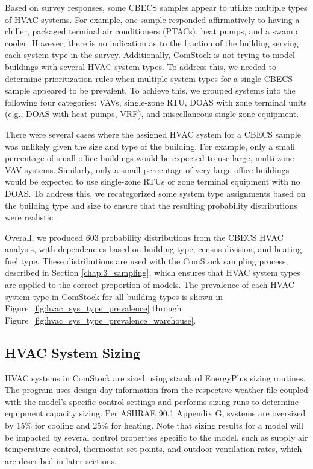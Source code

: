 Based on survey responses, some CBECS samples appear to utilize multiple types of HVAC systems. For example, one sample responded affirmatively to having a chiller, packaged terminal air conditioners (PTACs), heat pumps, and a swamp cooler. However, there is no indication as to the fraction of the building serving each system type in the survey. Additionally, ComStock is not trying to model buildings with several HVAC system types. To address this, we needed to determine prioritization rules when multiple system types for a single CBECS sample appeared to be prevalent. To achieve this, we grouped systems into the following four categories: VAVs, single-zone RTU, DOAS with zone terminal units (e.g., DOAS with heat pumps, VRF), and miscellaneous single-zone equipment.

There were several cases where the assigned HVAC system for a CBECS sample was unlikely given the size and type of the building. For example, only a small percentage of small office buildings would be expected to use large, multi-zone VAV systems. Similarly, only a small percentage of very large office buildings would be expected to use single-zone RTUs or zone terminal equipment with no DOAS. To address this, we recategorized some system type assignments based on the building type and size to ensure that the resulting probability distributions were realistic.

Overall, we produced 603 probability distributions from the CBECS HVAC analysis, with dependencies based on building type, census division, and heating fuel type. These distributions are used with the ComStock sampling process, described in Section \ref{chap:3_sampling}, which ensures that HVAC system types are applied to the correct proportion of models. The prevalence of each HVAC system type in ComStock for all building types is shown in Figure~\ref{fig:hvac_sys_type_prevalence} through Figure~\ref{fig:hvac_sys_type_prevalence_warehouse}.


\subsection{HVAC System Sizing}

HVAC systems in ComStock are sized using standard EnergyPlus sizing routines. The program uses design day information from the respective weather file coupled with the model's specific control settings and performs sizing runs to determine equipment capacity sizing. Per ASHRAE 90.1 Appendix G, systems are oversized by 15\% for cooling and 25\% for heating. Note that sizing results for a model will be impacted by several control properties specific to the model, such as supply air temperature control, thermostat set points, and outdoor ventilation rates, which are described in later sections.

